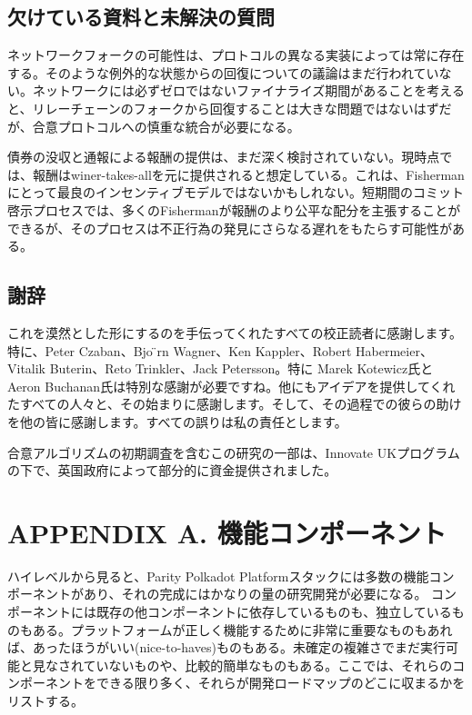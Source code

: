 \hypertarget{ux6b20ux3051ux3066ux3044ux308bux8cc7ux6599ux3068ux672aux89e3ux6c7aux306eux8ceaux554f}{%
\subsection{欠けている資料と未解決の質問}\label{ux6b20ux3051ux3066ux3044ux308bux8cc7ux6599ux3068ux672aux89e3ux6c7aux306eux8ceaux554f}}

ネットワークフォークの可能性は、プロトコルの異なる実装によっては常に存在する。そのような例外的な状態からの回復についての議論はまだ行われていない。ネットワークには必ずゼロではないファイナライズ期間があることを考えると、リレーチェーンのフォークから回復することは大きな問題ではないはずだが、合意プロトコルへの慎重な統合が必要になる。

債券の没収と通報による報酬の提供は、まだ深く検討されていない。現時点では、報酬はwiner-takes-allを元に提供されると想定している。これは、Fishermanにとって最良のインセンティブモデルではないかもしれない。短期間のコミット啓示プロセスでは、多くのFishermanが報酬のより公平な配分を主張することができるが、そのプロセスは不正行為の発見にさらなる遅れをもたらす可能性がある。

\hypertarget{ux8b1dux8f9e}{%
\subsection{謝辞}\label{ux8b1dux8f9e}}

これを漠然とした形にするのを手伝ってくれたすべての校正読者に感謝します。特に、Peter
Czaban、Bjo ̈rn Wagner、Ken Kappler、Robert Habermeier、Vitalik
Buterin、Reto Trinkler、Jack Petersson。特に Marek Kotewicz氏とAeron
Buchanan氏は特別な感謝が必要ですね。他にもアイデアを提供してくれたすべての人々と、その始まりに感謝します。そして、その過程での彼らの助けを他の皆に感謝します。すべての誤りは私の責任とします。

合意アルゴリズムの初期調査を含むこの研究の一部は、Innovate
UKプログラムの下で、英国政府によって部分的に資金提供されました。

\hypertarget{appendix-a.-ux6a5fux80fdux30b3ux30f3ux30ddux30fcux30cdux30f3ux30c8}{%
\section{APPENDIX A.
機能コンポーネント}\label{appendix-a.-ux6a5fux80fdux30b3ux30f3ux30ddux30fcux30cdux30f3ux30c8}}

ハイレベルから見ると、Parity Polkadot
Platformスタックには多数の機能コンポーネントがあり、それの完成にはかなりの量の研究開発が必要になる。
コンポーネントには既存の他コンポーネントに依存しているものも、独立しているものもある。プラットフォームが正しく機能するために非常に重要なものもあれば、あったほうがいい(nice-to-haves)ものもある。未確定の複雑さでまだ実行可能と見なされていないものや、比較的簡単なものもある。ここでは、それらのコンポーネントをできる限り多く、それらが開発ロードマップのどこに収まるかをリストする。

